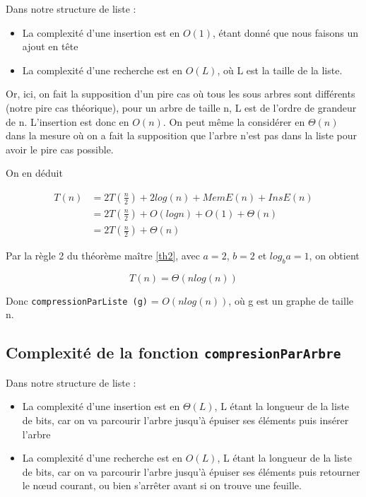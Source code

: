 \documentclass[12pt,a4paper]{article}
\begin{document}
Dans notre structure de liste : 
\begin{itemize}
\item La complexité d'une insertion est en $O(1)$, étant donné que nous faisons un ajout en tête
\item La complexité d'une recherche est en $O(L)$, où L est la taille de la liste.
\end{itemize}

Or, ici, on fait la supposition d'un pire cas où tous les sous arbres sont différents (notre pire cas théorique), pour un arbre de taille n, L est de l'ordre de grandeur de n. L'insertion est donc en $O(n)$. On peut même la considérer en $\Theta(n)$ dans la mesure où on a fait la supposition que l'arbre n'est pas dans la liste pour avoir le pire cas possible.

On en déduit 

\begin{align*}
T(n) &= 2 T(\frac{n}{2}) + 2log(n) + MemE(n) + InsE(n)\\
&= 2 T(\frac{n}{2}) + O(log n) + O(1) + \Theta (n)\\
&= 2 T(\frac{n}{2}) + \Theta (n)
\end{align*}

Par la règle 2 du théorème maître  \ref{th2}, avec $a = 2$, $b = 2$ et $log_b a = 1$, on obtient 

$$
T(n) = \Theta (n log (n))
$$ 

\medskip

Donc \texttt{compressionParListe (g)} = $O(n log (n))$, où g est un graphe de taille n.


\subsection{Complexité de la fonction \texttt{compresionParArbre}}

Dans notre structure de liste : 
\begin{itemize}
\item La complexité d'une insertion est en $\Theta(L)$, L étant la longueur de la liste de bits, car on va parcourir l'arbre jusqu'à épuiser ses éléments puis insérer l'arbre
\item La complexité d'une recherche est en $O(L)$, L étant la longueur de la liste de bits, car on va parcourir l'arbre jusqu'à épuiser ses éléments puis retourner le nœud courant, ou bien s'arrêter avant si on trouve une feuille.
\end{itemize}
\end{document}
